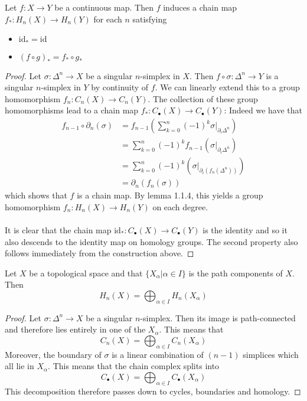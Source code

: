 \documentclass[a4paper]{article}
\begin{document}
\begin{prp}{}{} Let $f:X\to Y$ be a continuous map. Then $f$ induces a chain map $f_\ast:H_n(X)\to H_n(Y)$ for each $n$ satisfying
\begin{itemize}
\item $\text{id}_\ast=\text{id}$
\item $(f\circ g)_\ast=f_\ast\circ g_\ast$
\end{itemize} \tcbline
\begin{proof}
Let $\sigma:\Delta^n\to X$ be a singular $n$-simplex in $X$. Then $f\circ\sigma:\Delta^n\to Y$ is a singular $n$-simplex in $Y$ by continuity of $f$. We can linearly extend this to a group homomorphism $f_n:C_n(X)\to C_n(Y)$. The collection of these group homomorphisms lead to a chain map $f_\ast:C_\bullet(X)\to C_\bullet(Y)$: Indeed we have that 
\begin{align*}
f_{n-1}\circ\partial_n(\sigma)&=f_{n-1}\left(\sum_{k=0}^n(-1)^k\sigma|_{\partial_i\Delta^n}\right)\\
&=\sum_{k=0}^n(-1)^kf_{n-1}\left(\sigma|_{\partial_i\Delta^n}\right)\\
&=\sum_{k=0}^n(-1)^k\left(\sigma|_{\partial_i(f_n(\Delta^n))}\right)\\
&=\partial_n(f_n(\sigma))
\end{align*}
which shows that $f$ is a chain map. By lemma 1.1.4, this yields a group homomorphism $f_n:H_n(X)\to H_n(Y)$ on each degree. \\~\\

It is clear that the chain map $\text{id}_\ast:C_\bullet(X)\to C_\bullet(Y)$ is the identity and so it also descends to the identity map on homology groups. The second property also follows immediately from the construction above. 
\end{proof}
\end{prp}

\begin{prp}{}{} Let $X$ be a topological space and that $\{X_\alpha|\alpha\in I\}$ is the path components of $X$. Then $$H_n(X)=\bigoplus_{\alpha\in I} H_n(X_\alpha)$$ \tcbline
\begin{proof}
Let $\sigma:\Delta^n\to X$ be a singular $n$-simplex. Then its image is path-connected and therefore lies entirely in one of the $X_\alpha$. This means that $$C_n(X)=\bigoplus_{\alpha\in I}C_n(X_\alpha)$$ Moreover, the boundary of $\sigma$ is a linear combination of $(n-1)$ simplices which all lie in $X_\alpha$. This means that the chain complex splits into $$C_\bullet(X)=\bigoplus_{\alpha\in I}C_\bullet(X_\alpha)$$ This decomposition therefore passes down to cycles, boundaries and homology. 
\end{proof}
\end{prp}
\end{document}
